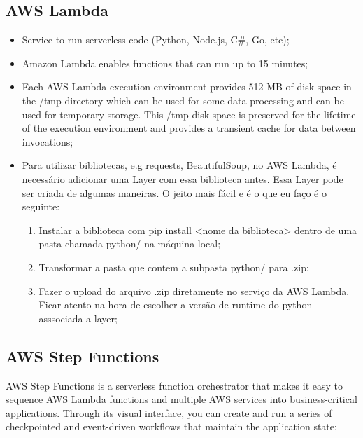 \subsection{AWS Lambda}
    \begin{itemize}
        \item Service to run serverless code (Python, Node.js, C\#, Go, etc);
        \item Amazon Lambda enables functions that can run up to 15 minutes;
        \item Each AWS Lambda execution environment provides 512 MB of disk space in the /tmp directory which can be used for some data processing and can be used for temporary storage. This /tmp disk space is preserved for the lifetime of the execution environment and provides a transient cache for data between invocations;
        \item Para utilizar bibliotecas, e.g requests, BeautifulSoup, no AWS Lambda, é necessário adicionar uma Layer com essa biblioteca antes. Essa Layer pode ser criada de algumas maneiras. O jeito mais fácil e é o que eu faço é o seguinte:
        
        \begin{enumerate}
            \item Instalar a biblioteca com pip install <nome da biblioteca> dentro de uma pasta chamada python/ na máquina local;
            \item Transformar a pasta que contem a subpasta python/ para .zip;
            \item Fazer o upload do arquivo .zip diretamente no serviço da AWS Lambda. Ficar atento na hora de escolher a versão de runtime do python asssociada a layer;
        \end{enumerate}
        
    \end{itemize}

\subsection{AWS Step Functions}
AWS Step Functions is a serverless function orchestrator that makes it easy to sequence AWS Lambda functions and multiple AWS services into business-critical applications. Through its visual interface, you can create and run a series of checkpointed and event-driven workflows that maintain the application state;


